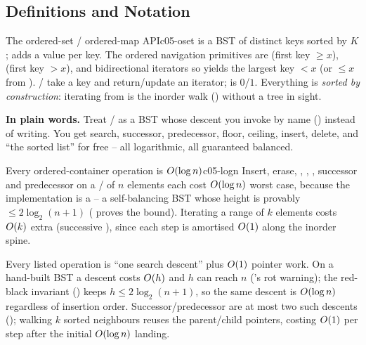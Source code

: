 \subsection{Definitions and Notation}

\begin{definition}{The ordered-set / ordered-map API}{c05-oset}
 is a BST of distinct keys sorted by $K$;  adds a value per key.
The ordered navigation primitives are  (first key $\ge x$), 
(first key $> x$), and bidirectional iterators so  yields the largest key $<x$ (or
$\le x$ from ). / take a key and return/update an iterator;
 is $0$/$1$. Everything is \emph{sorted by construction}: iterating from 
is the inorder walk () without a tree in sight.
\end{definition}

\noindent\textbf{In plain words.} Treat / as a BST whose descent you invoke by name
() instead of writing. You get search, successor, predecessor, floor, ceiling,
insert, delete, and ``the sorted list'' for free -- all logarithmic, all guaranteed balanced.

\begin{proposition}{Every ordered-container operation is $O(\log n)$}{c05-logn}
Insert, erase, , , , successor and predecessor on a
/ of $n$ elements each cost $O(\log n)$ worst case, because the implementation
is a  -- a self-balancing BST whose height is provably $\le 2\log_2(n+1)$
( proves the bound). Iterating a range of $k$ elements costs $O(k)$ extra (successive
\code{++}), since each step is amortised $O(1)$ along the inorder spine.
\end{proposition}
\begin{proofbox}
Every listed operation is ``one search descent'' plus $O(1)$ pointer work. On a hand-built BST a
descent costs $O(h)$ and $h$ can reach $n$ ('s rot warning); the red-black
invariant () keeps $h\le 2\log_2(n+1)$, so the same descent is $O(\log n)$ regardless of
insertion order. Successor/predecessor are at most two such descents (); walking $k$
sorted neighbours reuses the parent/child pointers, costing $O(1)$ per step after the initial
$O(\log n)$ landing. \end{proofbox}

